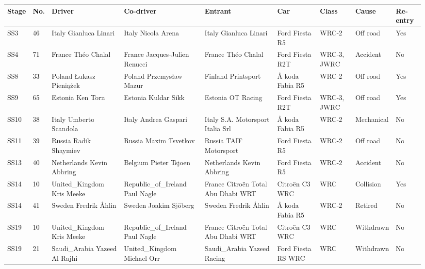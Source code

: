 \documentclass{article}
\begin{document}
\begin{tabular}{lllllllll}
\toprule
Stage & No. & Driver & Co-driver & Entrant & Car & Class & Cause & Re-entry \\
\midrule
SS3 & 46 & Italy Gianluca Linari & Italy Nicola Arena & Italy Gianluca Linari & Ford Fiesta R5 & WRC-2 & Off road & Yes \\
SS4 & 71 & France Théo Chalal & France Jacques-Julien Renucci & France Théo Chalal & Ford Fiesta R2T & WRC-3, JWRC & Accident & No \\
SS8 & 33 & Poland Łukasz Pieniążek & Poland Przemysław Mazur & Finland Printsport & Å koda Fabia R5 & WRC-2 & Off road & Yes \\
SS9 & 65 & Estonia Ken Torn & Estonia Kuldar Sikk & Estonia OT Racing & Ford Fiesta R2T & WRC-3, JWRC & Off road & Yes \\
SS10 & 38 & Italy Umberto Scandola & Italy Andrea Gaspari & Italy S.A. Motorsport Italia Srl & Å koda Fabia R5 & WRC-2 & Mechanical & No \\
SS11 & 39 & Russia Radik Shaymiev & Russia Maxim Tsvetkov & Russia TAIF Motorsport & Ford Fiesta R5 & WRC-2 & Off road & No \\
SS13 & 40 & Netherlands Kevin Abbring & Belgium Pieter Tsjoen & Netherlands Kevin Abbring & Ford Fiesta R5 & WRC-2 & Accident & No \\
SS14 & 10 & United\_Kingdom Kris Meeke & Republic\_of\_Ireland Paul Nagle & France Citroën Total Abu Dhabi WRT & Citroën C3 WRC & WRC & Collision & Yes \\
SS14 & 41 & Sweden Fredrik Åhlin & Sweden Joakim Sjöberg & Sweden Fredrik Åhlin & Å koda Fabia R5 & WRC-2 & Retired & No \\
SS19 & 10 & United\_Kingdom Kris Meeke & Republic\_of\_Ireland Paul Nagle & France Citroën Total Abu Dhabi WRT & Citroën C3 WRC & WRC & Withdrawn & No \\
SS19 & 21 & Saudi\_Arabia Yazeed Al Rajhi & United\_Kingdom Michael Orr & Saudi\_Arabia Yazeed Racing & Ford Fiesta RS WRC & WRC & Withdrawn & No \\
\bottomrule
\end{tabular}
\end{document}
